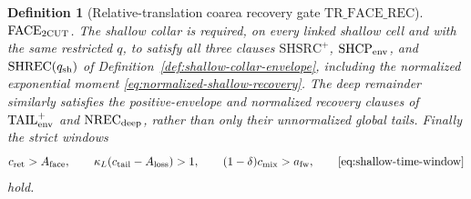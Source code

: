 \documentclass[11pt]{article}
\newtheorem{definition}[theorem]{Definition}
\begin{document}
\begin{definition}[Relative-translation coarea recovery gate
$\mathrm{TR\_FACE\_REC}$]
$\mathrm{FACE}_{\rm 2CUT}$.  The
shallow collar is required, on every linked shallow cell and with the same
restricted $q$, to satisfy all three clauses
$\mathrm{SHSRC}^{+}$, $\mathrm{SHCP}_{\rm env}$, and
$\mathrm{SHREC}(q_{\rm sh})$ of
Definition~\ref{def:shallow-collar-envelope}, including the normalized
exponential moment \eqref{eq:normalized-shallow-recovery}.  The deep
remainder similarly satisfies the positive-envelope and normalized recovery
clauses of $\mathrm{TAIL}_{\rm env}^{+}$ and
$\mathrm{NREC}_{\rm deep}$, rather than only their unnormalized global
tails.  Finally the strict windows
\begin{equation}
\label{eq:translation-recovery-windows}
 c_{\rm ret}>A_{\rm face},\qquad
 \kappa_L(c_{\rm tail}-A_{\rm loss})>1,
 \qquad (1-\delta)c_{\rm mix}>a_{\rm fw},
 \qquad \eqref{eq:shallow-time-window}
\end{equation}
hold.
\end{definition}
\end{document}
